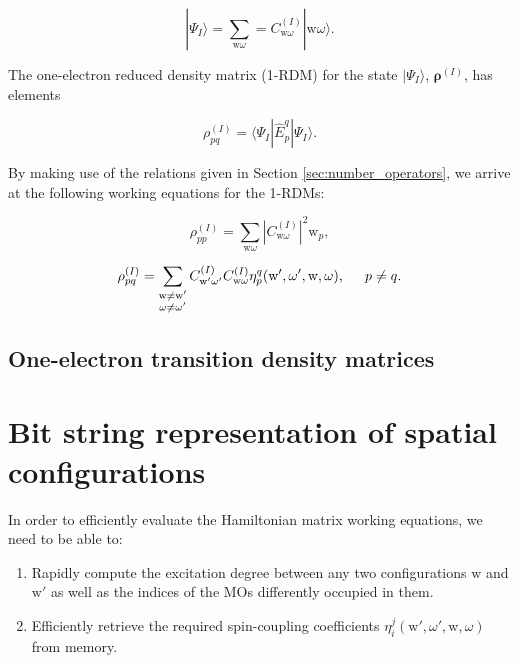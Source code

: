\documentclass[12pt,a4paper]{report}
\begin{document}
\begin{equation}
  | \Psi_{I} \rangle = \sum_{\text{w}\omega} =
  C_{\text{w}\omega}^{(I)} | \text{w} \omega \rangle.
\end{equation}

The one-electron reduced density matrix (1-RDM) for the state $|
\Psi_{I} \rangle$, $\boldsymbol{\rho}^{(I)}$, has elements

\begin{equation}
  \rho_{pq}^{(I)} = \langle \Psi_{I} | \hat{E}_{p}^{q} | \Psi_{I}
  \rangle.
\end{equation}

By making use of the relations given in Section
\ref{sec:number_operators}, we arrive at the following working
equations for the 1-RDMs:

\begin{equation}
  \rho_{pp}^{(I)} = \sum_{\text{w}\omega} \left|
  C_{\text{w}\omega}^{(I)} \right|^{2} \text{w}_{p},
\end{equation}

\begin{equation}
  \rho_{pq}^{(I)} = \sum_{\substack{\text{w}\ne\text{w}'
      \\ \omega\ne\omega'}} C_{\text{w}'\omega'}^{(I)}
  C_{\text{w}\omega}^{(I)}
  \eta_{p}^{q}(\text{w}',\omega',\text{w},\omega), \hspace{0.5cm}
  p \ne q.
\end{equation}

\section{One-electron transition density matrices}

\chapter{Bit string representation of spatial configurations}
In order to efficiently evaluate the Hamiltonian matrix working
equations, we need to be able to:

\begin{enumerate}
\item Rapidly compute the excitation degree between any two
  configurations $\text{w}$ and $\text{w}'$ as well as the indices of
  the MOs differently occupied in them.
\item Efficiently retrieve the required spin-coupling coefficients
  $\eta_{i}^{j}(\text{w}',\omega',\text{w},\omega)$ from memory.
\end{enumerate}
\end{document}
